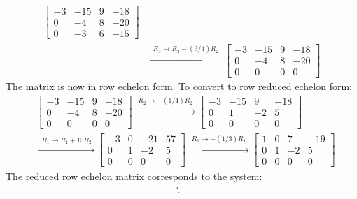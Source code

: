 \documentclass{article}
\begin{document}
\begin{itemize}
\begin{align*}
\left[\begin{array}{ccc|c}
-3 & -15 & 9 & -18\\
0 & -4 & 8 & -20 \\
0 & -3 & 6 & -15 
\end{array}\right] \\
& \xrightarrow{\begin{array}{c} R_3 \rightarrow R_3 - (3/4)R_2 \end{array}}  
\left[\begin{array}{ccc|c}
-3 & -15 & 9 & -18\\
0 & -4 & 8 & -20 \\
0 & 0 & 0 & 0 
\end{array}\right]
\end{align*}
The matrix is now in row echelon form. To convert to row reduced echelon form: 
\begin{align*}
& \left[\begin{array}{ccc|c}
-3 & -15 & 9 & -18\\
0 & -4 & 8 & -20 \\
0 & 0 & 0 & 0 
\end{array}\right] 
\xrightarrow{\begin{array}{c} R_2 \rightarrow -(1/4)R_2 \end{array}}  
\left[\begin{array}{ccc|c}
-3 & -15 & 9 & -18\\
0 & 1 & -2 & 5 \\
0 & 0 & 0 & 0 
\end{array}\right] \\
& \xrightarrow{\begin{array}{c} R_1 \rightarrow R_1 + 15R_2 \end{array}}  
\left[\begin{array}{ccc|c}
-3 & 0 & -21 & 57 \\
0 & 1 & -2 & 5 \\
0 & 0 & 0 & 0 
\end{array}\right]
\xrightarrow{\begin{array}{c} R_1 \rightarrow -(1/3)R_1 \end{array}}  
\left[\begin{array}{ccc|c}
1 & 0 & 7 & -19 \\
0 & 1 & -2 & 5 \\
0 & 0 & 0 & 0 
\end{array}\right]
\end{align*}
The reduced row echelon matrix corresponds to the system:
\[\left\{\begin{array}{c}

\end{array}\]
\end{itemize}
\end{document}
